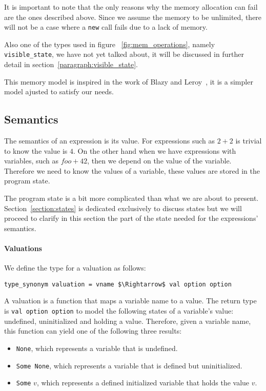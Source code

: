 It is important to note that the only reasons why the memory allocation can fail are the ones described above.
Since we assume the memory to be unlimited, there will not be a case where a \verb|new| call fails due to a lack of memory.


Also one of the types used in figure ~\ref{fig:mem_operations}, namely \verb|visible_state|, we have not yet talked about, it will be discussed in further detail in section~\ref{paragraph:visible_state}.

This memory model is inspired in the work of Blazy and Leroy~\parencite{compcert}, it is a simpler model ajusted to satisfy our needs.


\subsection{Semantics}\label{subsection:semantics_expressions}

The semantics of an expression is its value.
For expressions such as $2 + 2$ is trivial to know the value is $4$.
On the other hand when we have expressions with variables, such as $foo + 42$, then we depend on the value of the variable.
Therefore we need to know the values of a variable, these values are stored in the program state.

The program state is a bit more complicated than what we are about to present.
Section~\ref{section:states} is dedicated exclusively to discuss states but we will proceed to clarify in this section the part of the state needed for the expressions' semantics.

\paragraph{Valuations}\label{paragraph:valuation}

We define the type for a valuation as follows:

\begin{lstlisting}[frame=single, mathescape=true]
type_synonym valuation = vname $\Rightarrow$ val option option
\end{lstlisting}

A valuation is a function that maps a variable name to a value.
The return type is \verb|val option option| to model the following states of a variable's value: undefined, uninitialized and holding a value.
Therefore, given a variable name, this function can yield one of the following three results:

\begin{itemize}
  \item{\verb|None|, which represents a variable that is undefined.}
  \item{\verb|Some None|, which represents a variable that is defined but uninitialized.}
  \item{\verb|Some| $v$, which represents a defined initialized variable that holds the value $v$.}
\end{itemize}

